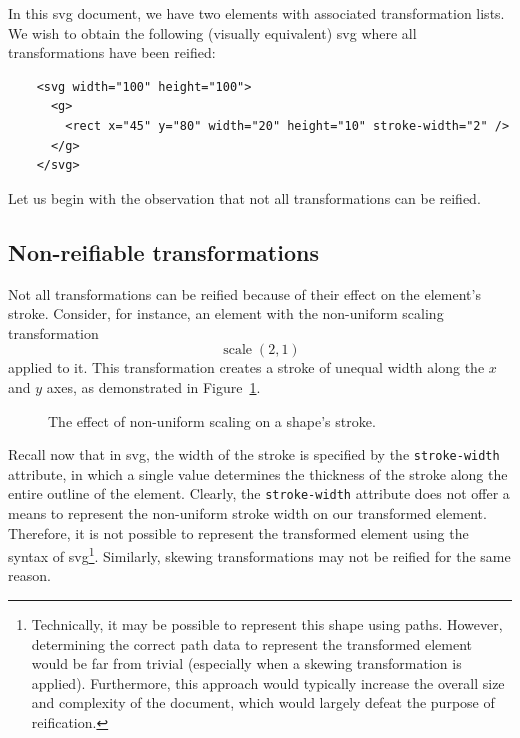 In this \gls{svg} document, we have two elements with associated transformation lists. We wish to obtain the following (visually equivalent) \gls{svg} where all transformations have been reified:
\begin{verbatim}
    <svg width="100" height="100">
      <g>
        <rect x="45" y="80" width="20" height="10" stroke-width="2" />
      </g>
    </svg>
\end{verbatim}

Let us begin with the observation that not all transformations can be reified.

\subsection{Non-reifiable transformations}

Not all transformations can be reified because of their effect on the element's stroke. Consider, for instance, an element with the non-uniform scaling transformation
    \[
        \operatorname{scale}(2, 1)
    \]
applied to it. This transformation creates a stroke of unequal width along the $x$ and $y$ axes, as demonstrated in Figure~\ref{fig:non-uniform-scale-rect}.
\begin{figure}[H]
    \centering
    \caption{The effect of non-uniform scaling on a shape's stroke.}
    \label{fig:non-uniform-scale-rect}
\end{figure}
Recall now that in \gls{svg}, the width of the stroke is specified by the \texttt{stroke-width} attribute, in which a single value determines the thickness of the stroke along the entire outline of the element. Clearly, the \texttt{stroke-width} attribute does not offer a means to represent the non-uniform stroke width on our transformed element. Therefore, it is not possible to represent the transformed element using the syntax of \gls{svg}\footnote{Technically, it may be possible to represent this shape using paths. However, determining the correct path data to represent the transformed element would be far from trivial (especially when a skewing transformation is applied). Furthermore, this approach would typically increase the overall size and complexity of the document, which would largely defeat the purpose of reification.}. Similarly, skewing transformations may not be reified for the same reason.

